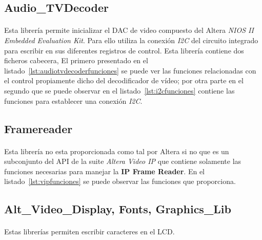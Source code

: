 \documentclass[a4paper,12pt,titlepage,final]{book}
\begin{document}
\subsection{Audio\_TVDecoder}
\paragraph{}
Esta librería permite inicializar el DAC de video compuesto del Altera \textit{NIOS II Embedded Evaluation Kit}. Para ello utiliza la conexión \textit{I2C} del circuito integrado para escribir en sus diferentes registros de control. Esta librería contiene dos ficheros cabecera, El primero presentado en el listado~\ref{lst:audiotvdecoderfunciones} se puede ver las funciones relacionadas con el control propiamente dicho del decodificador de vídeo; por otra parte en el segundo que se puede observar en el listado~\ref{lst:i2cfunciones} contiene las funciones para establecer una conexión \textit{I2C}.







\subsection{Framereader}
\paragraph{}
Esta librería no esta proporcionada como tal por Altera si no que es un subconjunto del API de la suite \textit{Altera Video IP} que contiene solamente las funciones necesarias para manejar la \textbf{IP Frame Reader}. En el listado~\ref{lst:vipfunciones} se puede observar las funciones que proporciona.



\subsection{Alt\_Video\_Display, Fonts, Graphics\_Lib}
\paragraph{}
Estas librerías permiten escribir caracteres en el LCD. 
\end{document}
